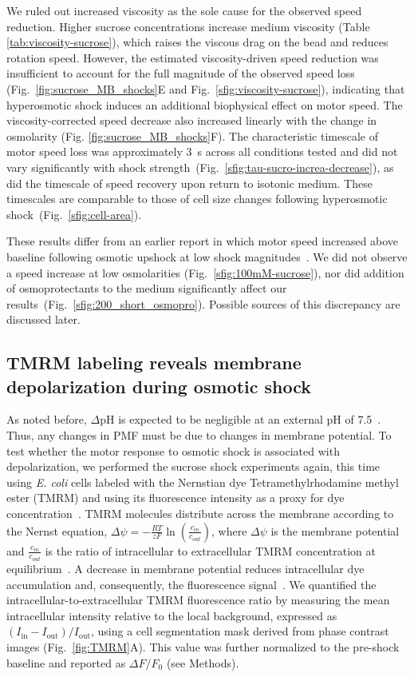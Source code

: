 \documentclass[twocolumn]{biophys-new}%
\begin{document}
We ruled out increased viscosity as the sole cause for the observed speed reduction. Higher sucrose concentrations increase medium viscosity (Table \ref{tab:viscosity-sucrose}), which raises the viscous drag on the bead and reduces rotation speed. However, the estimated viscosity-driven speed reduction was insufficient to account for the full magnitude of the observed speed loss (Fig.~\ref{fig:sucrose_MB_shocks}E and Fig.~\ref{sfig:viscosity-sucrose}), indicating that hyperosmotic shock induces an additional biophysical effect on motor speed. The viscosity-corrected speed decrease also increased linearly with the change in osmolarity (Fig. \ref{fig:sucrose_MB_shocks}F). The characteristic timescale of motor speed loss was approximately 3~s across all conditions tested and did not vary significantly with shock strength~(Fig.~\ref{sfig:tau-sucro-increa-decrease}), as did the timescale of speed recovery upon return to isotonic medium. These timescales are comparable to those of cell size changes following hyperosmotic shock~(Fig.~\ref{sfig:cell-area}).

These results differ from an earlier report in which motor speed increased above baseline following osmotic upshock at low shock magnitudes~\cite{rosko-2017}. We did not observe a speed increase at low osmolarities (Fig.~\ref{sfig:100mM-sucrose}), nor did addition of osmoprotectants to the medium significantly affect our results~(Fig.~\ref{sfig:200_short_osmopro}). Possible sources of this discrepancy are discussed later.



\subsection*{TMRM labeling reveals membrane depolarization during osmotic shock} 
As noted before, $\Delta$pH is expected to be negligible at an external pH of 7.5~\cite{padan1976,slonczewski1981}. Thus, any changes in PMF must be due to changes in membrane potential. To test whether the motor response to osmotic shock is associated with depolarization, we performed the sucrose shock experiments again, this time using \textit{E. coli} cells labeled with the Nernstian dye Tetramethylrhodamine methyl ester (TMRM) and using its fluorescence intensity as a proxy for dye concentration~\cite{LO2007etl,KRASNOPEEVA2019l}. TMRM molecules distribute across the membrane according to the Nernst equation, $\Delta\psi = -\frac{RT}{zF} \ln (\frac{c_{in}} {c_{out}})$, where $\Delta\psi$ is the membrane potential and $\frac{c_{in}} {c_{out}}$ is the ratio of intracellular to extracellular TMRM concentration at equilibrium~\cite{Ehrenberg1988membrane,Farkas1989simultaneous,BENARROCH2020304l}. A decrease in membrane potential reduces intracellular dye accumulation and, consequently, the fluorescence signal~\cite{jinetal2023l,KRASNOPEEVA2019l}. We quantified the intracellular-to-extracellular TMRM fluorescence ratio by measuring the mean intracellular intensity relative to the local background, expressed as $(I_{\mathrm{in}} - I_{\mathrm{out}})/I_{\mathrm{out}}$, using a cell segmentation mask derived from phase contrast images (Fig.~\ref{fig:TMRM}A). This value was further normalized to the pre-shock baseline and reported as $\Delta F/F_{0}$ (see Methods).
\end{document}
